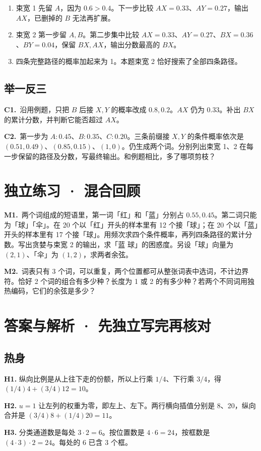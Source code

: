 \documentclass[UTF8,a4paper,11pt]{ctexart}
\newcommand{\PracticeQuestion}[3]{\par\Needspace{4\baselineskip}\noindent\begin{minipage}{\linewidth}\textbf{#1.}\ #2\par\noindent\rule{0pt}{#3mm}\par\end{minipage}\par}
\begin{document}
\begin{enumerate}
\item 束宽 1 先留 $A$，因为 $0.6>0.4$。下一步比较 $AX=0.33$、$AY=0.27$，输出 $AX$，已删掉的 $B$ 无法再扩展。
\item 束宽 2 第一步留 $A,B$。第二步集中比较 $AX=0.33$、$AY=0.27$、$BX=0.36$、$BY=0.04$，保留 $BX,AX$，输出分数最高的 $BX$。
\item 四条完整路径的概率加起来为 1。本题束宽 2 恰好搜索了全部四条路径。
\end{enumerate}
\subsection{举一反三}
\PracticeQuestion{C1}{沿用例题，只把 $B$ 后接 $X,Y$ 的概率改成 $0.8,0.2$。$AX$ 仍为 0.33。补出 $BX$ 的累计分数，并判断它能否超过 $AX$。}{27}
\PracticeQuestion{C2}{第一步为 $A:0.45$、$B:0.35$、$C:0.20$。三条前缀接 $X,Y$ 的条件概率依次是 $(0.51,0.49)$、$(0.85,0.15)$、$(1,0)$。仍生成两个词。分别列出束宽 1、2 在每一步保留的路径及分数，写最终输出。和例题相比，多了哪项剪枝？}{35}
\clearpage
\section{独立练习 · 混合回顾}
\PracticeQuestion{M1}{两个词组成的短语里，第一词「红」和「蓝」分别占 $0.55,0.45$。第二词只能为「球」「伞」。在 20 个以「红」开头的样本里有 12 个接「球」；在 20 个以「蓝」开头的样本里有 17 个接「球」。用频次求四个条件概率，再列四条路径的累计分数。写出贪婪与束宽 2 的输出，求「蓝 球」的困惑度。另设「球」向量为 $(2,1)$、「伞」为 $(1,2)$，求两者余弦。}{80}
\PracticeQuestion{M2}{词表只有 3 个词，可以重复，两个位置都可从整张词表中选词，不计边界符。恰好 2 个词的组合有多少种？长度为 1 或 2 的有多少种？若两个不同词用独热编码，它们的余弦是多少？}{34}
\clearpage
\section{答案与解析 · 先独立写完再核对}
\subsection{热身}
\textbf{H1.} 纵向比例是从上往下走的份额，所以上行乘 $1/4$、下行乘 $3/4$，得 $(1/4)4+(3/4)12=10$。

\textbf{H2.} $u=1$ 让左列的权重为零，即左上、左下。两行横向插值分别是 8、20，纵向合并是 $(3/4)8+(1/4)20=11$。

\textbf{H3.} 分类通道数是每处 $3\cdot2=6$。按位置数是 $4\cdot6=24$，按框数是 $(4\cdot3)\cdot2=24$。每处的 6 已含 3 个框。
\end{document}
